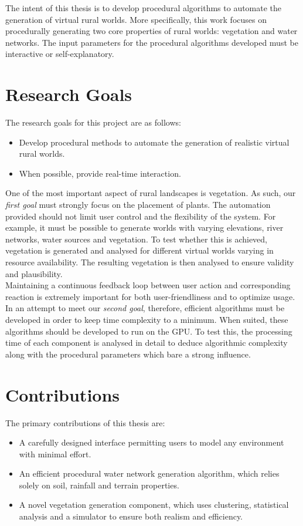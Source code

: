 The intent of this thesis is to develop procedural algorithms to automate the generation of virtual rural worlds. More specifically, this work focuses on procedurally generating two core properties of rural worlds: vegetation and water networks. The input parameters for the procedural algorithms developed must be interactive or self-explanatory. 

\newpage
\section{Research Goals}

The research goals for this project are as follows:
\begin{itemize}
\item Develop procedural methods to automate the generation of realistic virtual rural worlds.
\item When possible, provide real-time interaction.
\end{itemize}

One of the most important aspect of rural landscapes is vegetation. As such, our \textit{first goal} must strongly focus on the placement of plants. The automation provided should not limit user control and the flexibility of the system. For example, it must be possible to generate worlds with varying elevations, river networks, water sources and vegetation. To test whether this is achieved, vegetation is generated and analysed for different virtual worlds varying in resource availability. The resulting vegetation is then analysed to ensure validity and plausibility. \\

Maintaining a continuous feedback loop between user action and corresponding reaction is extremely important for both user-friendliness and to optimize usage. In an attempt to meet our \textit{second goal}, therefore, efficient algorithms must be developed in order to keep time complexity to a minimum. When suited, these algorithms should be developed to run on the GPU. To test this, the processing time of each component is analysed in detail to deduce algorithmic complexity along with the procedural parameters which bare a strong influence. \\

\section{Contributions}

The primary contributions of this thesis are:
\begin{itemize}
\item A carefully designed interface permitting users to model any environment with minimal effort.
\item An efficient procedural water network generation algorithm, which relies solely on soil, rainfall and terrain properties.
\item A novel vegetation generation component, which uses clustering, statistical analysis and a simulator to ensure both realism and efficiency.
\end{itemize}

